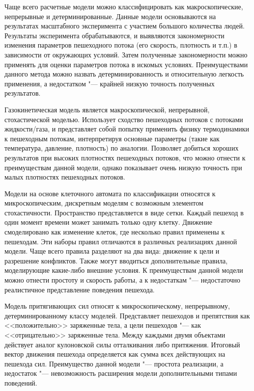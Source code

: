 Чаще всего расчетные модели можно классифицировать как макроскопические, непрерывные и детерминированные.
Данные модели основываются на результатах масштабного эксперимента с участием большого количества людей.
Результаты эксперимента обрабатываются, и выявляются закономерности изменения параметров пешеходного потока (его скорость, плотность и т.п.) в зависимости от окружающих условий.
Затем полученные закономерности можно применять для оценки параметров потока в искомых условиях.
Преимуществами данного метода можно назвать детерминированность и относительную легкость применения, а недостатком "--- крайней низкую точность полученных результатов.

Газокинетическая модель является макроскопической, непрерывной, стохастической моделью.
Использует сходство пешеходных потоков с потоками жидкости/газа, и представляет собой попытку применить физику термодинамики к пешеходным потокам,
интерпретируя основные параметры (такие как температура, давление, плотность) по аналогии.
Позволяет добиться хороших результатов при высоких плотностях пешеходных потоков, что можно отнести к преимуществам данной модели,
однако показывает очень низкую точность при малых плотностях пешеходных потоков.

Модели на основе клеточного автомата по классификации относятся к микроскопическим, дискретным моделям с возможным элементом стохастичности.
Пространство представляется в виде сетки.  Каждый пешеход в один момент времени может занимать только одну клетку.
Движение смоделировано как изменение клеток, где несколько правил применены к пешеходам. Эти наборы правил отличаются в различных реализациях данной модели.
Чаще всего правила разделяют на два вида: движение к цели и разрешение конфликтов.
Также могут вводиться дополнительные правила, моделирующие какие-либо внешние условия.
К преимуществам данной модели можно отнести простоту и скорость работы, а к недостаткам "--- недостаточно реалистичное представление поведения пешехода.

Модель притягивающих сил относят к микроскопическому, непрерывному, детерминированному классу моделей.
Представляет пешеходов и препятствия как <<положительно>> заряженные тела, а цели пешеходов "--- как <<отрицательно>> заряженные тела.
Между каждыми двумя объектами действует аналог кулоновской силы отталкивания либо притяжения.
Итоговый вектор движения пешехода определяется как сумма всех действующих на пешехода сил.
Преимущество данной модели "--- простота реализации, а недостаток "--- невозможность расширения модели дополнительными типами поведений.

